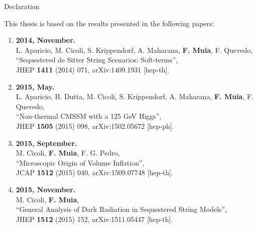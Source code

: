 \documentclass[12pt,a4paper]{book}
\newcommand{\ben}{\begin{enumerate}}
\newcommand{\een}{\end{enumerate}}
\begin{document}
\begin{midpage}
\begin{center}
\huge Declaration
\end{center}

This thesis is based on the results presented in the following papers:\\
\ben
\item[] \cite{Aparicio:2014wxa} \textbf{2014, November.}\\
L. Aparicio, M. Cicoli, S. Krippendorf, A. Maharana, \textbf{F. Muia}, F. Quevedo,\\
``Sequestered de Sitter String Scenarios: Soft-terms'',\\
JHEP {\bf 1411} (2014) 071, arXiv:1409.1931 [hep-th].\\

\item[] \cite{Aparicio:2015sda} \textbf{2015, May.}\\
L. Aparicio, B. Dutta, M. Cicoli, S. Krippendorf, A. Maharana, \textbf{F. Muia}, F. Quevedo,\\
``Non-thermal CMSSM with a 125 GeV Higgs'',\\
JHEP {\bf 1505} (2015) 098, arXiv:1502.05672 [hep-ph].\\

\item[] \cite{Cicoli:2015wja} \textbf{2015, September.}\\
M. Cicoli, \textbf{F. Muia}, F. G. Pedro,\\
``Microscopic Origin of Volume Inflation'',\\
JCAP {\bf 1512} (2015) 040, arXiv:1509.07748 [hep-th].\\

\item[] \cite{Cicoli:2015bpq} \textbf{2015, November.}\\
M. Cicoli, \textbf{F. Muia},\\
``General Analysis of Dark Radiation in Sequestered String Models'',\\
JHEP {\bf 1512} (2015) 152, arXiv:1511.05447 [hep-th].\\
\een

\end{midpage}

\newpage
\end{document}

